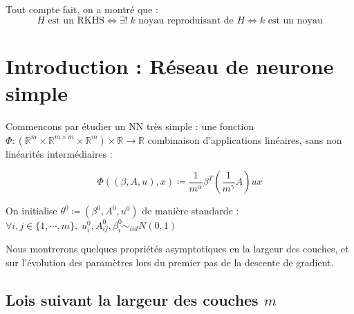 \documentclass[a4paper, 11pt, french]{article}
\theoremstyle{definition}
\begin{document}
	Tout compte fait, on a montré que :
	\[H \text{ est un RKHS} \Leftrightarrow \exists ! \; k \text{ noyau reproduisant de $H$} \Leftrightarrow k \text{ est un noyau}\]
	
	
	
	
	
	
	
	
	
	
	
	
	
	\section{Introduction : Réseau de neurone simple}
	
	Commencons par étudier un NN très simple : une fonction
	$\Phi : (\mathbb{R}^m \times \mathbb{R}^{m \times m} \times \mathbb{R}^m) \times \mathbb{R} \to \mathbb{R}$ combinaison d'applications linéaires, sans non linéarités  intermédiaires  :
	
	\[ \Phi ((\beta, A, u), x) \coloneqq \frac{1}{m^{\alpha}} \beta^T
		 \left( \frac{1}{m^{\gamma}} A \right) u x \]
		 
	On initialise $\theta^0 \coloneqq (\beta^0, A^0, u^0)$ de manière standarde : 
	$ \forall i,j \in \{1, \cdots, m\} , \; u_i^0, A_{ij}^0, \beta_i^0 \sim_{iid} N(0, 1)$
	
	Nous montrerons quelques propriétés asymptotiques en la largeur des couches, et sur l'évolution des paramètres lors du premier pas de la descente de gradient.
	
	\subsection{Lois suivant la largeur des couches $m$}
	
\end{document}
